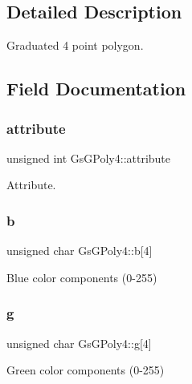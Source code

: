 \subsection{Detailed Description}
Graduated 4 point polygon. 

\subsection{Field Documentation}
\mbox{\label{structGsGPoly4_af5e7a061fb2b0a57972442dcf2f78bce}} 
\subsubsection{\texorpdfstring{attribute}{attribute}}
{\footnotesize\ttfamily unsigned int Gs\+G\+Poly4\+::attribute}



Attribute. 

\mbox{\label{structGsGPoly4_a35675523985a715e01f86b1f0dfe908c}} 
\subsubsection{\texorpdfstring{b}{b}}
{\footnotesize\ttfamily unsigned char Gs\+G\+Poly4\+::b\mbox{[}4\mbox{]}}



Blue color components (0-\/255) 

\mbox{\label{structGsGPoly4_abb1a69f0f5846b10c77ccc5cc61ae909}} 
\subsubsection{\texorpdfstring{g}{g}}
{\footnotesize\ttfamily unsigned char Gs\+G\+Poly4\+::g\mbox{[}4\mbox{]}}



Green color components (0-\/255) 

\mbox{\label{structGsGPoly4_ad1bcb72c4a381b75479a7d272078e7ce}} 
